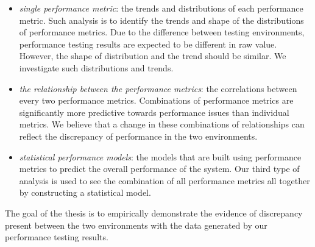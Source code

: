 \begin{itemize}
	\item \textit{single performance metric}: the trends and distributions of each performance metric. Such analysis is to identify the trends and shape of the distributions of performance metrics.
	Due to the difference between testing environments, performance testing results are expected to be
	different in raw value. However, the shape of distribution and the trend should be similar. We investigate such distributions and trends. 
	\item \textit{the relationship between the performance metrics}: the correlations between every two performance metrics. Combinations of performance metrics are significantly more predictive
	towards performance issues than individual metrics. We believe that a change in these combinations
	of relationships can reflect the discrepancy of performance in the two environments.
	\item \textit{statistical performance models}: the models that are built using performance metrics to predict the overall performance of the system. Our third type of analysis is used to see the combination of all performance metrics all together by
	constructing a statistical model.
	
\end{itemize}

The goal of the thesis is to empirically demonstrate the evidence of discrepancy present between the two environments with the data generated by our performance testing results. 







